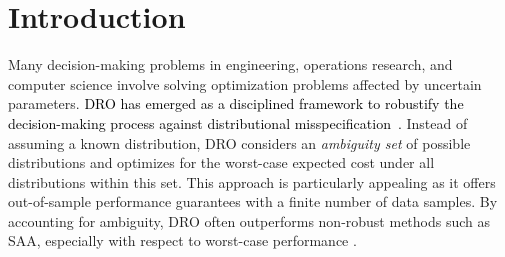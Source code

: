 \documentclass[12pt]{article}
\newcommand{\ie}{{\it i.e.}}
\newcommand{\RC}[1]{\textcolor{black}{#1}}
\newcommand{\RC}[1]{\textcolor{blue}{#1}}
\begin{document}
\section{Introduction}
Many decision-making problems in engineering, operations research, and computer science involve solving optimization problems affected by uncertain parameters.
\RC{\Gls{DRO} has emerged as a disciplined framework to robustify the decision-making process against distributional misspecification~\cite{dro_survey,kuhn_dro_book}.}
Instead of assuming a known distribution, \gls{DRO} considers an \emph{ambiguity set} of possible distributions and optimizes for the worst-case expected cost under all distributions within this set.
This approach is particularly appealing as it offers out-of-sample performance guarantees with a finite number of data samples. 
By accounting for ambiguity, \gls{DRO} often outperforms non-robust methods such as \gls{SAA}, especially with respect to worst-case performance \cite{gao2016distributionally}.

\end{document}
